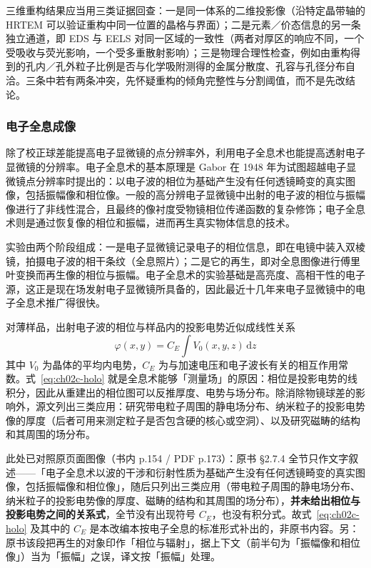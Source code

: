\begin{crosscheck}
三维重构结果应当用三类证据回查：一是同一体系的二维投影像（沿特定晶带轴的 HRTEM 可以验证重构中同一位置的晶格与界面）；二是元素／价态信息的另一条独立通道，即 EDS 与 EELS 对同一区域的一致性（两者对厚区的响应不同，一个受吸收与荧光影响，一个受多重散射影响）；三是物理合理性检查，例如由重构得到的孔内／孔外粒子比例是否与化学吸附测得的金属分散度、孔容与孔径分布自洽。三条中若有两条冲突，先怀疑重构的倾角完整性与分割阈值，而不是先改结论。
\end{crosscheck}

\subsubsection{电子全息成像}

除了校正球差能提高电子显微镜的点分辨率外，利用电子全息术也能提高透射电子显微镜的分辨率。电子全息术的基本原理是 Gabor 在 1948 年为试图超越电子显微镜点分辨率时提出的：以电子波的相位为基础产生没有任何透镜畸变的真实图像，包括振幅像和相位像。一般的高分辨电子显微镜中出射的电子波的相位与振幅像进行了非线性混合，且最终的像衬度受物镜相位传递函数的复杂修饰；电子全息术则是通过恢复像的相位和振幅，进而再生真实物体信息的技术。

实验由两个阶段组成：一是电子显微镜记录电子的相位信息，即在电镜中装入双棱镜，拍摄电子波的相干条纹（全息照片）；二是它的再生，即对全息图像进行傅里叶变换而再生像的相位与振幅。电子全息术的实验基础是高亮度、高相干性的电子源，这正是现在场发射电子显微镜所具备的，因此最近十几年来电子显微镜中的电子全息术推广得很快。

\begin{principle}
对薄样品，出射电子波的相位与样品内的投影电势近似成线性关系
\begin{equation}
\varphi(x,y)=C_E\int V_0(x,y,z)\,\mathrm{d}z
\label{eq:ch02c-holo}
\end{equation}
其中 $V_0$ 为晶体的平均内电势，$C_E$ 为与加速电压和电子波长有关的相互作用常数。式~\eqref{eq:ch02c-holo} 就是全息术能够「测量场」的原因：相位是投影电势的线积分，因此从重建出的相位图可以反推厚度、电势与场分布。除消除物镜球差的影响外，源文列出三类应用：研究带电粒子周围的静电场分布、纳米粒子的投影电势像的厚度（后者可用来测定粒子是否包含硬的核心或空洞）、以及研究磁畴的结构和其周围的场分布。
\end{principle}

此处已对照原页面图像（书内 p.154 / PDF p.173）：原书 \S 2.7.4 全节只作文字叙述——「电子全息术以波的干涉和衍射性质为基础产生没有任何透镜畸变的真实图像，包括振幅像和相位像」，随后只列出三类应用（带电粒子周围的静电场分布、纳米粒子的投影电势像的厚度、磁畴的结构和其周围的场分布），\textbf{并未给出相位与投影电势之间的关系式}，全节没有出现符号 $C_E$，也没有积分式。故式~\eqref{eq:ch02c-holo} 及其中的 $C_E$ 是本改编本按电子全息的标准形式补出的，非原书内容。另：原书该段把再生的对象印作「相位与辐射」，据上下文（前半句为「振幅像和相位像」）当为「振幅」之误，译文按「振幅」处理。

